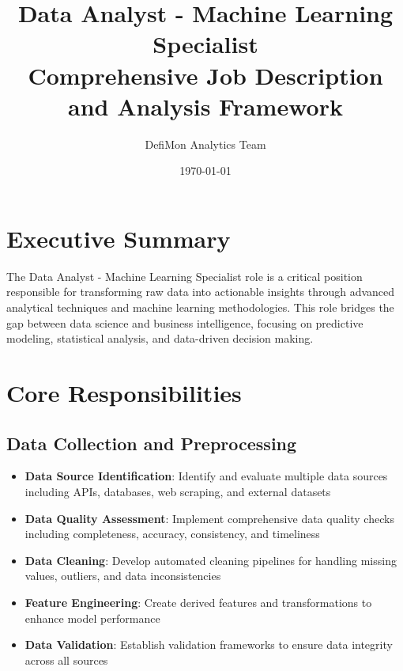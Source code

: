 \documentclass[11pt,a4paper]{article}
\title{\textbf{Data Analyst - Machine Learning Specialist}\\
\large Comprehensive Job Description and Analysis Framework}
\author{DefiMon Analytics Team}
\date{\today}
\begin{document}
\maketitle

\tableofcontents
\newpage

\section{Executive Summary}

The Data Analyst - Machine Learning Specialist role is a critical position responsible for transforming raw data into actionable insights through advanced analytical techniques and machine learning methodologies. This role bridges the gap between data science and business intelligence, focusing on predictive modeling, statistical analysis, and data-driven decision making.

\section{Core Responsibilities}

\subsection{Data Collection and Preprocessing}
\begin{itemize}[leftmargin=*]
    \item \textbf{Data Source Identification}: Identify and evaluate multiple data sources including APIs, databases, web scraping, and external datasets
    \item \textbf{Data Quality Assessment}: Implement comprehensive data quality checks including completeness, accuracy, consistency, and timeliness
    \item \textbf{Data Cleaning}: Develop automated cleaning pipelines for handling missing values, outliers, and data inconsistencies
    \item \textbf{Feature Engineering}: Create derived features and transformations to enhance model performance
    \item \textbf{Data Validation}: Establish validation frameworks to ensure data integrity across all sources
\end{itemize}
\end{document}
